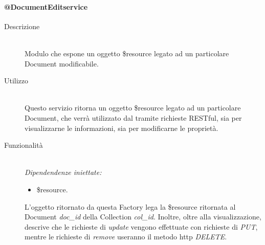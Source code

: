 \paragraph{@DocumentEditservice}
\begin{description}
 \item[Descrizione] \hfill \\
 Modulo che espone un oggetto \$resource legato ad un particolare Document modificabile.
 
 \item[Utilizzo] \hfill \\
 Questo servizio ritorna un oggetto \$resource legato ad un particolare Document, che verrà  utilizzato dal  tramite 
 richieste RESTful, sia per visualizzarne  le informazioni, sia per modificarne le proprietà.
 
 \item[Funzionalità] \hfill \\
 \emph{Dipendendenze iniettate:}
 \begin{itemize}
  \item \$resource.
 \end{itemize}
 L'oggetto ritornato da questa Factory lega la \$resource ritornata al Document \textit{doc\_id} della Collection
 \textit{col\_id}. Inoltre, oltre alla visualizzazione, descrive che le richieste di \textit{update} vengono effettuate
 con richieste di \textit{PUT}, mentre le richieste di \textit{remove} useranno il metodo http \textit{DELETE}.
 
\end{description}

